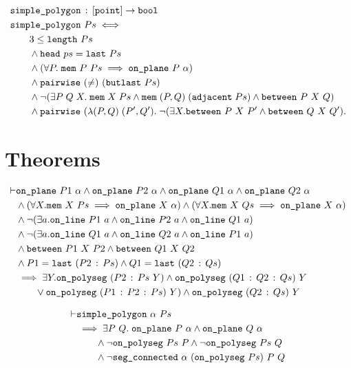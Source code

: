 \begin{align*}
  &\code{simple\_polygon}\,:\,[\code{point}] \rightarrow \code{bool}\\
  &\code{simple\_polygon}\ Ps \iff \\
  &\qquad 3 \leq \code{length}\ Ps\\
  &\qquad\wedge \code{head}\ ps = \code{last}\ Ps\\
  &\qquad\wedge (\forall P.\;\code{mem}\ P\ Ps \implies \code{on\_plane}\ P\ \alpha)\\
  &\qquad\wedge \code{pairwise}\ (\neq)\ (\code{butlast}\ Ps)\\
  &\qquad\wedge \neg(\exists P\;Q\;X.\; \code{mem}\;X\;Ps\wedge\code{mem}\;(P,Q)\;(\code{adjacent}\;Ps)\wedge\between{P}{X}{Q})\\
  &\qquad\wedge \code{pairwise}\ (\lambda(P,Q)\;(P',Q').\;\neg(\exists X. \between{P}{X}{P'} \wedge \between{Q}{X}{Q'}).
\end{align*}

\section{Theorems}
\begin{align*}
\vdash &\code{on\_plane}\ P1\ \alpha \wedge \code{on\_plane}\ P2\ \alpha \wedge \code{on\_plane}\ Q1\ \alpha \wedge \code{on\_plane}\ Q2\ \alpha\\
       &\wedge(\forall X. \code{mem}\ X\ Ps \implies \code{on\_plane}\ X\ \alpha) \wedge (\forall X. \code{mem}\ X\ Qs \implies \code{on\_plane}\ X\ \alpha)\\
       &\wedge\Triangle{a}{P1}{P2}{Q1}\\
       &\wedge\Triangle{a}{Q1}{Q2}{P1}\\
       &\wedge\code{between}\ P1\ X\ P2 \wedge \code{between}\ Q1\ X\ Q2\\
       &\wedge P1 = \code{last}\ (\cons{P2}{Ps}) \wedge Q1 = \code{last}\ (\cons{Q2}{Qs})\\
       &\implies \exists Y. \code{on\_polyseg}\ (\cons{P2}{Ps}\ Y) \wedge \code{on\_polyseg}\ (\cons{Q1}{\cons{Q2}{Qs}})\ Y\\
       &\qquad\vee \code{on\_polyseg}\ (\cons{P1}{\cons{P2}{Ps}})\ Y) \wedge \code{on\_polyseg}\ (\cons{Q2}{Qs})\ Y
\end{align*}

\begin{align*}
\vdash &\code{simple\_polygon}\ \alpha\ Ps\\
       &\implies \exists P\ Q.\; \code{on\_plane}\ P\ \alpha \wedge \code{on\_plane}\ Q\ \alpha\\
       &\qquad\wedge \neg\code{on\_polyseg}\ Ps\ P \wedge \neg\code{on\_polyseg}\ Ps\ Q\\
       &\qquad\wedge \neg\code{seg\_connected}\ \alpha\ (\code{on\_polyseg}\ Ps)\ P\ Q
\end{align*}

